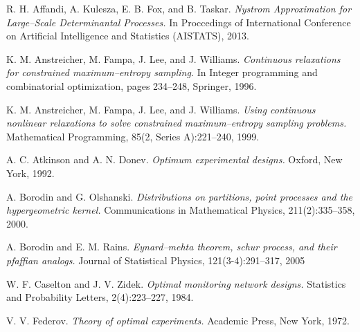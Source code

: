\documentclass[]{interact}
\theoremstyle{plain}%
\theoremstyle{definition}
\theoremstyle{remark}
\begin{document}




\begin{thebibliography}{99}

R. H. Affandi, A. Kulesza, E. B. Fox, and B. Taskar. {\em Nystrom Approximation for Large--Scale Determinantal Processes.} In Proccedings of International Conference on Artificial Intelligence and Statistics (AISTATS), 2013.

K. M. Anstreicher, M. Fampa, J. Lee, and J. Williams. {\em Continuous relaxations for constrained maximum--entropy sampling.} In Integer programming and combinatorial optimization, pages 234--248, Springer, 1996.

K. M. Anstreicher, M. Fampa, J. Lee, and J. Williams. {\em Using continuous nonlinear relaxations to solve constrained maximum--entropy sampling problems.} Mathematical Programming, 85(2, Series A):221--240, 1999.

A. C. Atkinson and A. N. Donev. {\em Optimum experimental designs.} Oxford, New York, 1992.

A. Borodin and G. Olshanski. {\em Distributions on partitions, point processes and the hypergeometric kernel.} Communications in Mathematical Physics, 211(2):335–358, 2000.

A. Borodin and E. M. Rains. {\em Eynard–mehta theorem, schur process, and their pfaffian analogs.} Journal of Statistical Physics, 121(3-4):291–317, 2005

W. F. Caselton and J. V. Zidek. {\em Optimal monitoring network designs.} Statistics and Probability Letters, 2(4):223–227, 1984.

V. V. Federov. {\em Theory of optimal experiments.} Academic Press, New York, 1972.


\end{thebibliography}
\end{document}
